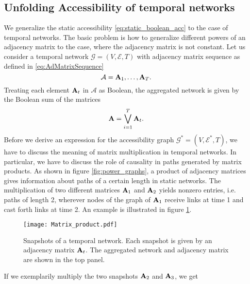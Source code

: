 \subsection{Unfolding Accessibility of temporal networks}\label{sec:unfolding_temporal}
We generalize the static accessibility \eqref{eq:static_boolean_acc} to the case of temporal networks.
The basic problem is how to generalize different powers of an adjacency matrix to the case, where the adjacency matrix is not constant.
Let us consider a temporal network $\mathcal{G}=(V,\mathcal{E},T)$ with adjacency matrix sequence as defined in \eqref{eq:AdMatrixSequence}
\begin{equation}\label{eq:AdMatrixSequence2}
\mathcal{A}=\mathbf{A}_1,\dots ,\mathbf{A}_T .
\end{equation}
Treating each element $\mathbf{A}_t$ in $\mathcal{A}$ as Boolean, the aggregated network is given by the Boolean sum of the matrices
\begin{equation}\label{eq:aggregation}
\mathbf{A}=\bigvee _{i=1} ^{T} \mathbf{A}_t .
\end{equation}
Before we derive an expression for the accessibility graph $\mathcal{G}^*=(V,\mathcal{E}^*,T)$, we have to discuss the meaning of matrix multiplication in temporal networks.
In particular, we have to discuss the role of causality in paths generated by matrix products.
As shown in figure \ref{fig:power_graphs}, a product of adjacency matrices gives information about paths of a certain length in static networks.
The multiplication of two different matrices $\mathbf{A}_1$ and $\mathbf{A}_2$ yields nonzero entries, i.e. paths of length 2, wherever nodes of the graph of $\mathbf{A}_1$ receive links at time 1 and cast forth links at time 2.
An example is illustrated in figure \ref{fig:matrix_product}.
%
\begin{figure}[htb]
\begin{center}
\texttt{[image: Matrix\_product.pdf]}
\caption{Snapshots of a temporal network.
Each snapshot is given by an adjacency matrix $\mathbf{A}_t$.
The aggregated network and adjacency matrix are shown in the top panel.}
\label{fig:matrix_product}
\end{center}
\end{figure}
%
If we exemplarily multiply the two snapshots $\mathbf{A}_2$ and $\mathbf{A}_3$, we get
